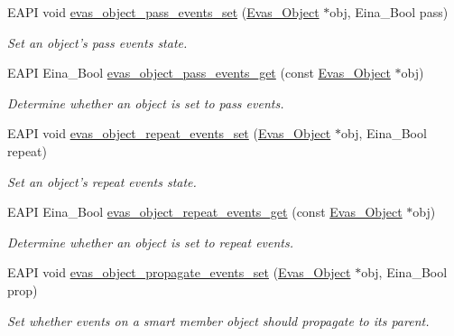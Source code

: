 \begin{DoxyCompactItemize}
EAPI void \hyperlink{group__Evas__Object__Group__Events_ga5622d84abe1bd303de71f8ddbdcd0665}{evas\_\-object\_\-pass\_\-events\_\-set} (\hyperlink{group__Evas__Object__Group_ga9e19e6dd1f517a0ba437c0114d3e7c97}{Evas\_\-Object} $\ast$obj, Eina\_\-Bool pass)
\begin{DoxyCompactList}\small\item\em Set an object's pass events state. \item\end{DoxyCompactList}\item 
EAPI Eina\_\-Bool \hyperlink{group__Evas__Object__Group__Events_ga019458a8697c55dc3d5e3fe525c535e0}{evas\_\-object\_\-pass\_\-events\_\-get} (const \hyperlink{group__Evas__Object__Group_ga9e19e6dd1f517a0ba437c0114d3e7c97}{Evas\_\-Object} $\ast$obj)
\begin{DoxyCompactList}\small\item\em Determine whether an object is set to pass events. \item\end{DoxyCompactList}\item 
EAPI void \hyperlink{group__Evas__Object__Group__Events_gaacd5e00427f3c98ecfb72f630ff7aa46}{evas\_\-object\_\-repeat\_\-events\_\-set} (\hyperlink{group__Evas__Object__Group_ga9e19e6dd1f517a0ba437c0114d3e7c97}{Evas\_\-Object} $\ast$obj, Eina\_\-Bool repeat)
\begin{DoxyCompactList}\small\item\em Set an object's repeat events state. \item\end{DoxyCompactList}\item 
EAPI Eina\_\-Bool \hyperlink{group__Evas__Object__Group__Events_ga2c7ca0c2c33ec1e12da64f60a5742582}{evas\_\-object\_\-repeat\_\-events\_\-get} (const \hyperlink{group__Evas__Object__Group_ga9e19e6dd1f517a0ba437c0114d3e7c97}{Evas\_\-Object} $\ast$obj)
\begin{DoxyCompactList}\small\item\em Determine whether an object is set to repeat events. \item\end{DoxyCompactList}\item 
EAPI void \hyperlink{group__Evas__Object__Group__Events_gaca523e82bd3e590f92e8bbda29c1607d}{evas\_\-object\_\-propagate\_\-events\_\-set} (\hyperlink{group__Evas__Object__Group_ga9e19e6dd1f517a0ba437c0114d3e7c97}{Evas\_\-Object} $\ast$obj, Eina\_\-Bool prop)
\begin{DoxyCompactList}\small\item\em Set whether events on a smart member object should propagate to its parent. \item\end{DoxyCompactList}\item 

\end{DoxyCompactItemize}
